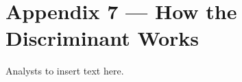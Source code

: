%
\appendix
\section*{Appendix 7 --- How the Discriminant Works}
\label{appendix-separationmethod}

{\color{red}Analysts to insert text here.}
